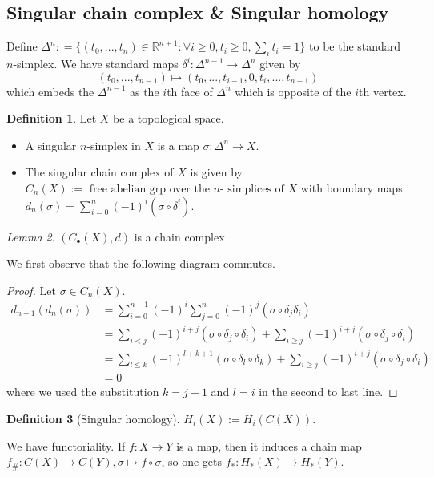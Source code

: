 \documentclass{article}
\theoremstyle{definition}
\newtheorem{defn}{Definition}[section]
\theoremstyle{remark}
\newtheorem{lem}[defn]{Lemma}
\theoremstyle{plain}
\newcommand{\RR}{\mathbb{R}}
\begin{document}
\subsection{Singular chain complex \& Singular homology}
Define $\Delta^n\colon=\{(t_0,...,t_n)\in\RR^{n+1}\colon\forall i\ge0, t_i\ge 0, \sum_it_i=1\}$ to be the standard $n$-simplex. We have standard maps $\delta^i:\Delta^{n-1}\to \Delta^n$ given by
\[(t_0,...,t_{n-1})\mapsto (t_0,...,t_{i-1},0,t_i,...,t_{n-1})\]
which embeds the $\Delta^{n-1}$ as the $i$th face of $\Delta^n$ which is opposite of the $i$th vertex.
\begin{defn}
    Let $X$ be a topological space.
    \begin{itemize}
        \item A singular $n$-simplex in $X$ is a map $\sigma:\Delta^n\to X$.
        \item The singular chain complex of $X$ is given by $C_n(X):=\text{ free abelian grp over the }n\text{- simplices of }X$ with boundary maps $d_n(\sigma)=\sum_{i=0}^n(-1)^i(\sigma\circ\delta^i)$.
    \end{itemize}
\end{defn}
\begin{lem}
    $(C_\bullet(X),d)$ is a chain complex
\end{lem}
We first observe that the following diagram commutes.
\begin{center}
\end{center}
\begin{proof}
    Let $\sigma\in C_n(X)$.
    \begin{align*}
        d_{n-1}(d_n(\sigma))&=\sum_{i=0}^{n-1}(-1)^i\sum_{j=0}^n(-1)^j(\sigma\circ\delta_j\delta_i)\\
        &=\sum_{i<j}(-1)^{i+j}(\sigma\circ\delta_j\circ\delta_i)+\sum_{i\ge j}(-1)^{i+j}(\sigma\circ\delta_j\circ\delta_i)\\
        &=\sum_{l\le k}(-1)^{l+k+1}(\sigma\circ\delta_l\circ\delta_k)+\sum_{i\ge j}(-1)^{i+j}(\sigma\circ\delta_j\circ\delta_i)\\
        &=0
    \end{align*}
    where we used the substitution $k=j-1$ and $l=i$ in the second to last line.
\end{proof}
\begin{defn}[Singular homology]
    $H_i(X):=H_i(C(X))$.
\end{defn}
We have functoriality. If $f:X\to Y$ is a map, then it induces a chain map $f_\#:C(X)\to C(Y),\sigma\mapsto f\circ\sigma$, so one gets $f_\ast:H_\ast(X)\to H_\ast(Y)$.
\end{document}

